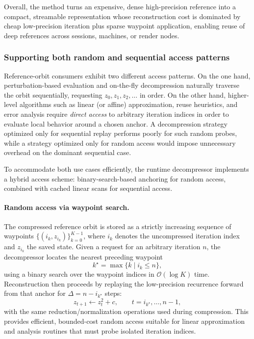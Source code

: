 Overall, the method turns an expensive, dense high-precision reference into a
compact, streamable representation whose reconstruction cost is dominated by
cheap low-precision iteration plus sparse waypoint application, enabling reuse
of deep references across sessions, machines, or render nodes.

\subsubsection{Supporting both random and sequential access patterns}
\label{sec:refcomp-runtime-access}

Reference-orbit consumers exhibit two different access patterns.
On the one hand, perturbation-based evaluation and on-the-fly decompression
naturally traverse the orbit sequentially, requesting
\(z_0, z_1, z_2, \dots\) in order.  On the other hand, higher-level algorithms
such as linear (or affine) approximation, reuse heuristics, and error analysis
require \emph{direct access} to arbitrary iteration indices in order to evaluate
local behavior around a chosen anchor.  A decompression strategy optimized only
for sequential replay performs poorly for such random probes, while a strategy
optimized only for random access would impose unnecessary overhead on the
dominant sequential case.

To accommodate both use cases efficiently, the runtime decompressor implements a
hybrid access scheme: binary-search-based anchoring for random access, combined
with cached linear scans for sequential access.

\paragraph{Random access via waypoint search.}
The compressed reference orbit is stored as a strictly increasing sequence of
waypoints
\(
\{(i_k, z_{i_k})\}_{k=0}^{K-1}
\),
where \(i_k\) denotes the uncompressed iteration index and \(z_{i_k}\) the saved
state.  Given a request for an arbitrary iteration \(n\), the decompressor locates the nearest
preceding waypoint
\begin{equation}
  k^\star = \max\{k \mid i_k \le n\},
  \label{eq:waypoint-search}
\end{equation}
using a binary search over the waypoint indices in
\(\mathcal{O}(\log K)\) time.  Reconstruction then proceeds by replaying the
low-precision recurrence forward from that anchor for
\(\Delta = n - i_{k^\star}\) steps:
\begin{equation}
  z_{t+1} \leftarrow z_t^2 + c,
  \qquad t = i_{k^\star}, \dots, n-1,
  \label{eq:replay-recurrence}
\end{equation}
with the same reduction/normalization operations used during compression.  This
provides efficient, bounded-cost random access suitable for linear approximation
and analysis routines that must probe isolated iteration indices.

